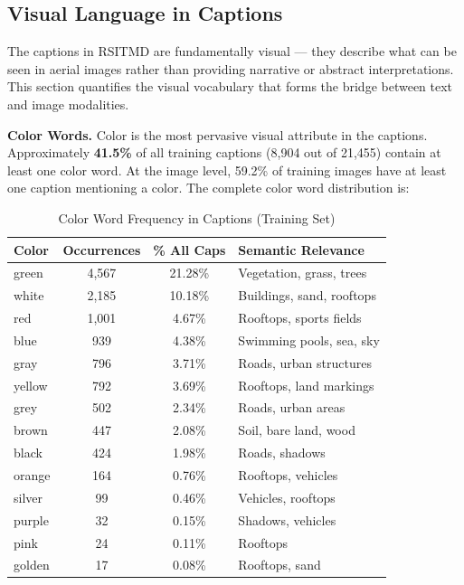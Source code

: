 \subsection{Visual Language in Captions}

The captions in RSITMD are fundamentally visual --- they describe what can be seen in aerial images rather than providing narrative or abstract interpretations. This section quantifies the visual vocabulary that forms the bridge between text and image modalities.

\textbf{Color Words.} Color is the most pervasive visual attribute in the captions. Approximately \textbf{41.5\%} of all training captions (8,904 out of 21,455) contain at least one color word. At the image level, 59.2\% of training images have at least one caption mentioning a color. The complete color word distribution is:

\begin{table}[H]
\centering
\caption{Color Word Frequency in Captions (Training Set)}
\label{tab:color_words}
\begin{tabular}{|l|c|c|l|}
\hline
\textbf{Color} & \textbf{Occurrences} & \textbf{\% All Caps} & \textbf{Semantic Relevance} \\
\hline
    green & 4,567 & 21.28\% & Vegetation, grass, trees \\
    white & 2,185 & 10.18\% & Buildings, sand, rooftops \\
    red & 1,001 & 4.67\% & Rooftops, sports fields \\
    blue & 939 & 4.38\% & Swimming pools, sea, sky \\
    gray & 796 & 3.71\% & Roads, urban structures \\
    yellow & 792 & 3.69\% & Rooftops, land markings \\
    grey & 502 & 2.34\% & Roads, urban areas \\
    brown & 447 & 2.08\% & Soil, bare land, wood \\
    black & 424 & 1.98\% & Roads, shadows \\
    orange & 164 & 0.76\% & Rooftops, vehicles \\
    silver & 99 & 0.46\% & Vehicles, rooftops \\
    purple & 32 & 0.15\% & Shadows, vehicles \\
    pink & 24 & 0.11\% & Rooftops \\
    golden & 17 & 0.08\% & Rooftops, sand \\
\hline
\end{tabular}
\end{table}


